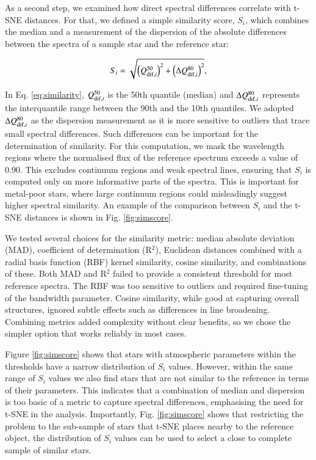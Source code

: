 \documentclass{aa}
\begin{document}
As a second step, we examined how direct spectral differences correlate with t-SNE distances. For that, we defined a simple similarity score, $S_i$, which combines the median and a measurement of the dispersion of the absolute differences between the spectra of a sample star and the reference star:

\begin{equation}
    S_i = \sqrt{\left( Q_{{\rm dif}, i}^{50}\right)^2 + \left( \Delta Q_{{\rm dif}, i}^{80}\right)^2 },
    \label{eq:similarity}
\end{equation}

\noindent In Eq. \ref{eq:similarity}, $Q_{{\rm dif}, i}^{50}$ is the 50th quantile (median) and $\Delta Q_{{\rm dif}, i}^{80}$ represents the interquantile range between the 90th and the 10th quantiles. We adopted $\Delta Q_{{\rm dif}, i}^{80}$ as the dispersion measurement as it is more sensitive to outliers that trace small spectral differences. Such differences can be important for the determination of similarity. For this computation, we mask the wavelength regions where the normalised flux of the reference spectrum exceeds a value of 0.90. This excludes continuum regions and weak spectral lines, ensuring that $S_i$ is computed only on more informative parts of the spectra. This is important for metal-poor stars, where large continuum regions could misleadingly suggest higher spectral similarity. An example of the comparison between $S_i$ and the t-SNE distances is shown in Fig. \ref{fig:simscore}.

We tested several choices for the similarity metric: median absolute deviation (MAD), coefficient of determination (R$^2$), Euclidean distances combined with a radial basis function (RBF) kernel similarity, cosine similarity, and combinations of these. Both MAD and R$^2$ failed to provide a consistent threshold for most reference spectra. The RBF was too sensitive to outliers and required fine-tuning of the bandwidth parameter. Cosine similarity, while good at capturing overall structures, ignored subtle effects such as differences in line broadening. Combining metrics added complexity without clear benefits, so we chose the simpler option that works reliably in most cases.

Figure \ref{fig:simscore} shows that stars with atmospheric parameters within the thresholds have a narrow distribution of $S_i$ values. However, within the same range of $S_i$ values we also find stars that are not similar to the reference in terms of their parameters. This indicates that a combination of median and dispersion is too basic of a metric to capture spectral differences, emphasising the need for t-SNE in the analysis. Importantly, Fig. \ref{fig:simscore} shows that restricting the problem to the sub-sample of stars that t-SNE places nearby to the reference object, the distribution of $S_i$ values can be used to select a close to complete sample of similar stars.
\end{document}
